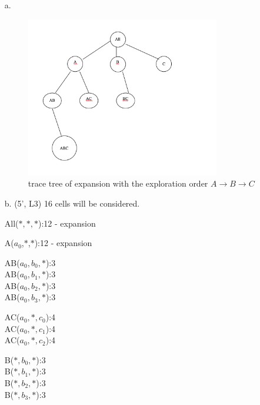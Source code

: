 \begin{itemize}

\item[a.] 
\begin{figure}[H]
\includegraphics[width=0.8\textwidth]{Figures/treetrace.png}
\centering
\caption{trace tree of expansion with the exploration order $A\rightarrow B \rightarrow C$}
\label{fig:tree}
\end{figure}

\item[b.] (5', L3) 16 cells will be considered. 

All($*,*,*$):12 - expansion

\underline{\hspace{ 1in}}

A($a_0$,$*$,$*$):12 - expansion

\underline{\hspace{ 1in}}

AB($a_0,b_0,*$):3\\
AB($a_0,b_1,*$):3\\
AB($a_0,b_2,*$):3\\
AB($a_0,b_3,*$):3

\underline{\hspace{ 1in}}

AC($a_0,*,c_0$):4\\
AC($a_0,*,c_1$):4\\
AC($a_0,*,c_2$):4

\underline{\hspace{ 1in}}

B($*,b_0,*$):3\\
B($*,b_1,*$):3\\
B($*,b_2,*$):3\\
B($*,b_3,*$):3


\end{itemize}
